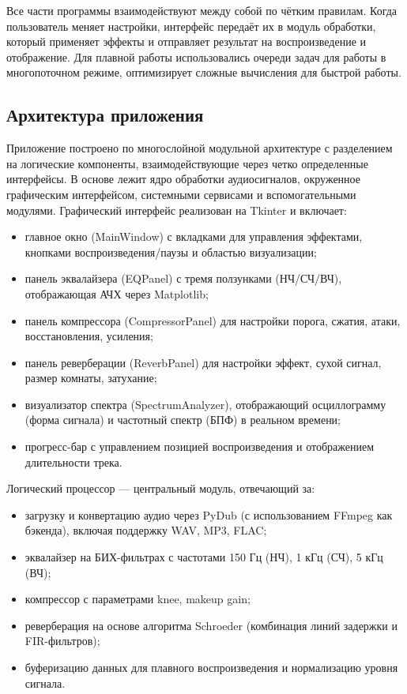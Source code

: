 Все части программы взаимодействуют между собой по чётким правилам. Когда пользователь меняет настройки, интерфейс передаёт их в модуль обработки, который применяет эффекты и отправляет результат на воспроизведение и отображение. Для плавной работы использовались очереди задач для работы в многопоточном режиме, оптимизирует сложные вычисления для быстрой работы.

\subsection{Архитектура приложения}
Приложение построено по многослойной модульной архитектуре с разделением на логические компоненты, взаимодействующие через четко определенные интерфейсы. В основе лежит ядро обработки аудиосигналов, окруженное графическим интерфейсом, системными сервисами и вспомогательными модулями.
Графический интерфейс реализован на Tkinter и включает:
\begin{itemize}
	\item главное окно (MainWindow) с вкладками для управления эффектами, кнопками воспроизведения/паузы и областью визуализации;
	\item панель эквалайзера (EQPanel) с тремя ползунками (НЧ/СЧ/ВЧ), отображающая АЧХ через Matplotlib;
	\item панель компрессора (CompressorPanel) для настройки порога, сжатия, атаки, восстановления, усиления;
	\item панель реверберации (ReverbPanel) для настройки эффект, сухой сигнал, размер комнаты, затухание;
	\item визуализатор спектра (SpectrumAnalyzer), отображающий осциллограмму (форма сигнала) и частотный спектр (БПФ) в реальном времени;
	\item прогресс-бар с управлением позицией воспроизведения и отображением длительности трека.	
\end{itemize}

Логический процессор — центральный модуль, отвечающий за:
\begin{itemize}
	\item загрузку и конвертацию аудио через PyDub (с использованием FFmpeg как бэкенда), включая поддержку WAV, MP3, FLAC;
	\item эквалайзер на БИХ-фильтрах с частотами 150 Гц (НЧ), 1 кГц (СЧ), 5 кГц (ВЧ);
	\item компрессор с параметрами knee, makeup gain;
	\item реверберация на основе алгоритма Schroeder (комбинация линий задержки и FIR-фильтров);
	\item буферизацию данных для плавного воспроизведения и нормализацию уровня сигнала.
\end{itemize}

